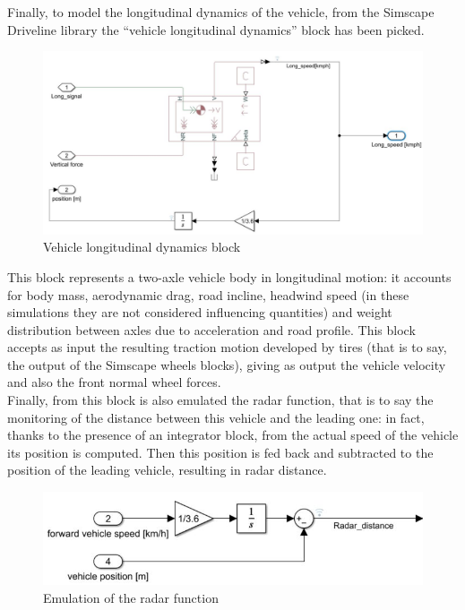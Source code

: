 \documentclass[12pt,a4paper]{report}
\begin{document}
Finally, to model the longitudinal dynamics of the vehicle, from the Simscape Driveline library the “vehicle longitudinal dynamics” block has been picked.


\begin{figure}[htbp]
	\centering
	\includegraphics[scale=0.5]{LongitudinalDynamic.jpg}
	\caption{Vehicle longitudinal dynamics block}
\end{figure}

This block represents a two-axle vehicle body in longitudinal motion: it accounts for body mass, aerodynamic drag, road incline, headwind speed (in these simulations they are not considered influencing quantities) and weight distribution between axles due to acceleration and road profile. This block accepts as input the resulting traction motion developed by tires (that is to say, the output of the Simscape wheels blocks), giving as output the vehicle velocity and also the front normal wheel forces.\\
Finally, from this block is also emulated the radar function, that is to say the monitoring of the distance between this vehicle and the leading one: in fact, thanks to the presence of an integrator block, from the actual speed of the vehicle its position is computed. Then this position is fed back and subtracted to the position of the leading vehicle, resulting in radar distance.

\begin{figure}[htbp]
	\centering
	\includegraphics{RadarFunction.jpg}
	\caption{Emulation of the radar function}
\end{figure}
\end{document}
